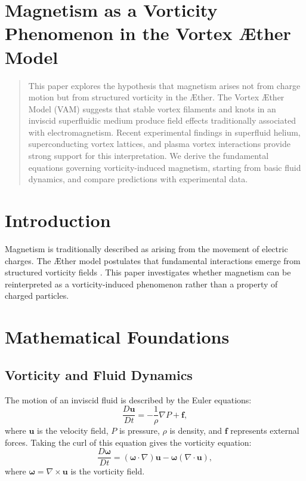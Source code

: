 

\section{Magnetism as a Vorticity Phenomenon in the Vortex \AE ther Model}

\begin{abstract}
    This paper explores the hypothesis that magnetism arises not from charge motion but from structured vorticity in the \AE ther. The Vortex \AE ther Model (VAM) suggests that stable vortex filaments and knots in an inviscid superfluidic medium produce field effects traditionally associated with electromagnetism. Recent experimental findings in superfluid helium, superconducting vortex lattices, and plasma vortex interactions provide strong support for this interpretation. We derive the fundamental equations governing vorticity-induced magnetism, starting from basic fluid dynamics, and compare predictions with experimental data.
\end{abstract}

\section{Introduction}
Magnetism is traditionally described as arising from the movement of electric charges. The \AE ther model postulates that fundamental interactions emerge from structured vorticity fields \cite{superfluid_he_interferometers}. This paper investigates whether magnetism can be reinterpreted as a vorticity-induced phenomenon rather than a property of charged particles.

\section{Mathematical Foundations}

\subsection{Vorticity and Fluid Dynamics}
The motion of an inviscid fluid is described by the Euler equations:
\begin{equation}
    \frac{D\boldsymbol{u}}{Dt} = -\frac{1}{\rho} \nabla P + \boldsymbol{f},
\end{equation}
where $\boldsymbol{u}$ is the velocity field, $P$ is pressure, $\rho$ is density, and $\boldsymbol{f}$ represents external forces. Taking the curl of this equation gives the vorticity equation:
\begin{equation}
    \frac{D\boldsymbol{\omega}}{Dt} = (\boldsymbol{\omega} \cdot \nabla) \boldsymbol{u} - \boldsymbol{\omega} (\nabla \cdot \boldsymbol{u}),
\end{equation}
where $\boldsymbol{\omega} = \nabla \times \boldsymbol{u}$ is the vorticity field.

